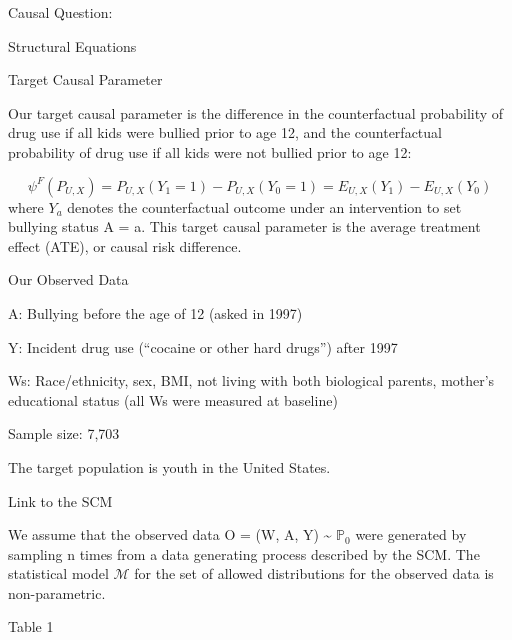 \documentclass[ignorenonframetext,]{beamer}
\begin{document}
\begin{frame}{Causal Question:}
\begin{block}{Structural Equations}
\end{block}

\begin{block}{Target Causal Parameter}

Our target causal parameter is the difference in the counterfactual
probability of drug use if all kids were bullied prior to age 12, and
the counterfactual probability of drug use if all kids were not bullied
prior to age 12:

\[
\psi^F (P_{U,X}) = P_{U,X} (Y_1 = 1) - P_{{U,X}}(Y_0=1) = E_{U,X}(Y_1) - E_{U,X}(Y_0)
\] where \(Y_a\) denotes the counterfactual outcome under an
intervention to set bullying status A = a. This target causal parameter
is the average treatment effect (ATE), or causal risk difference.

\end{block}

\begin{block}{Our Observed Data}

A: Bullying before the age of 12 (asked in 1997)

Y: Incident drug use (``cocaine or other hard drugs'') after 1997

Ws: Race/ethnicity, sex, BMI, not living with both biological parents,
mother's educational status (all Ws were measured at baseline)

Sample size: 7,703

The target population is youth in the United States.

\end{block}

\begin{block}{Link to the SCM}

We assume that the observed data O = (W, A, Y) \textasciitilde{}
\(\mathbb{P}_0\) were generated by sampling n times from a data
generating process described by the SCM. The statistical model
\(\mathcal{M}\) for the set of allowed distributions for the observed
data is non-parametric.

\end{block}

\begin{block}{Table 1}

\fontsize{8}{8} \selectfont 


\end{block}
\end{frame}
\end{document}
